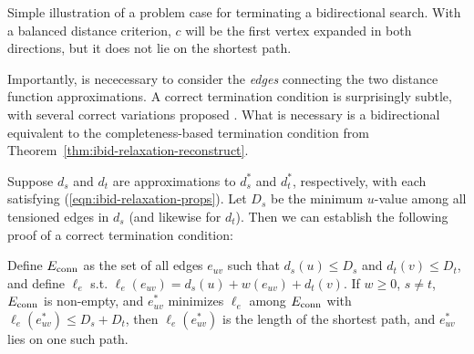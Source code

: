 \begin{marginfigure}
   \centering
   \caption{Simple illustration of a problem case for terminating
      a bidirectional search.
      With a balanced distance criterion,
      $c$ will be the first vertex expanded in both directions,
      but it does not lie on the shortest path.}
   \label{fig:ibid:bidirectional-termination-issue}
\end{marginfigure}

Importantly, is nececessary to consider the \emph{edges} connecting
the two distance function approximations.
A correct termination condition is surprisingly subtle,%
with several correct variations proposed
\citep{nicholson1966shortest, dreyfus1969appraisalsp,
pohl1969bidirectional, goldberg2005spexternalmemory}.
What is necessary is a bidirectional equivalent to the 
completeness-based termination condition
from Theorem~\ref{thm:ibid-relaxation-reconstruct}.

Suppose $d_s$ and $d_t$ are approximations to $d^*_s$ and $d_t^*$,
respectively,
with each satisfying (\ref{eqn:ibid-relaxation-props}).
Let $D_s$ be the minimum $u$-value among all tensioned edges in $d_s$
(and likewise for $d_t$).
Then we can establish the following proof of a correct termination
condition:

\begin{theorem}
Define $E_{\mbox{\scriptsize conn}}$ as the set of all edges $e_{uv}$ such that
$d_s(u) \leq D_s$ and $d_t(v) \leq D_t$,
and define $\ell_e$ s.t. $\ell_e(e_{uv}) = d_s(u) + w(e_{uv}) + d_t(v)$.
If $w \geq 0$,
$s \neq t$,
$E_{\mbox{\scriptsize conn}}$ is non-empty,
and $e^*_{uv}$ minimizes $\ell_e$
among $E_{\mbox{\scriptsize conn}}$ with $\ell_e(e^*_{uv}) \leq D_s + D_t$,
then $\ell_e(e^*_{uv})$ is the length of the shortest path,
and $e^*_{uv}$ lies on one such path.
\label{thm:ibid-bidir-sound}
\end{theorem}

